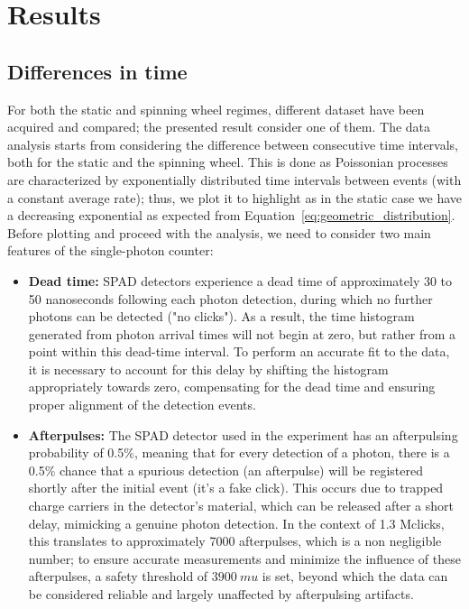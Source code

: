 \documentclass[prl,twocolumn]{revtex4-1}
\begin{document}
\section{Results}
\subsection{Differences in time}
For both the static and spinning wheel regimes, different dataset have been acquired and compared; the presented result consider one of them. 
The data analysis starts from considering the difference between consecutive time intervals, both for the static and the spinning wheel. This is done as Poissonian processes are characterized by exponentially distributed time intervals
between events (with a constant average rate); thus, we plot it to highlight as in the static case we have a decreasing exponential as expected from Equation~\eqref{eq:geometric_distribution}. Before plotting and proceed with the analysis, we need to consider two main features of the single-photon counter:
\begin{itemize}
    \item \textbf{Dead time:} SPAD detectors experience a dead time of approximately 30 to 50 nanoseconds following each photon detection, during which no further photons can be detected ("no clicks"). As a result, the time histogram generated from photon arrival times will not begin at zero, but rather from a point within this dead-time interval. To perform an accurate fit to the data, it is necessary to account for this delay by shifting the histogram appropriately towards zero, compensating for the dead time and ensuring proper alignment of the detection events.
    
    \item \textbf{Afterpulses:} The SPAD detector used in the experiment has an afterpulsing probability of 0.5\%, meaning that for every detection of a photon, there is a 0.5\% chance that a spurious detection (an afterpulse) will be registered shortly after the initial event (it's a fake click). This occurs due to trapped charge carriers in the detector's material, which can be released after a short delay, mimicking a genuine photon detection. In the context of 1.3 Mclicks, this translates to approximately 7000 afterpulses, which is a non negligible number; to ensure accurate measurements and minimize the influence of these afterpulses, a safety threshold of $3900 \: mu$ is set, beyond which the data can be considered reliable and largely unaffected by afterpulsing artifacts.
\end{itemize}
\end{document}
